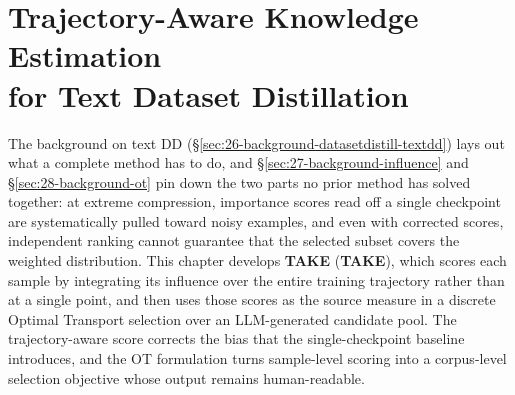 \acresetall

\chapter[Trajectory-Aware Knowledge Estimation for Text Dataset Distillation]{Trajectory-Aware Knowledge Estimation \\ for Text Dataset Distillation} \label{ch:50-research03}

\begin{foldable}
  The background on text \ac{DD} (\S\ref{sec:26-background-datasetdistill-textdd}) lays out what a complete method has to do, and \S\ref{sec:27-background-influence} and \S\ref{sec:28-background-ot} pin down the two parts no prior method has solved together: at extreme compression, importance scores read off a single checkpoint are systematically pulled toward noisy examples, and even with corrected scores, independent ranking cannot guarantee that the selected subset covers the weighted distribution.
  This chapter develops \textbf{\acl{TAKE}} (\textbf{\acs{TAKE}}), which scores each sample by integrating its influence over the entire training trajectory rather than at a single point, and then uses those scores as the source measure in a discrete Optimal Transport selection over an \ac{LLM}-generated candidate pool.
  The trajectory-aware score corrects the bias that the single-checkpoint baseline introduces, and the \ac{OT} formulation turns sample-level scoring into a corpus-level selection objective whose output remains human-readable.
\end{foldable}







